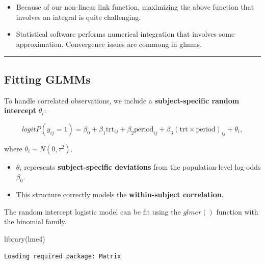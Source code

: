 \documentclass[
  letterpaper,
  DIV=11,
  numbers=noendperiod]{scrreprt}
\newenvironment{Shaded}{\begin{snugshade}}{\end{snugshade}}
\newcommand{\FunctionTok}[1]{\textcolor[rgb]{0.28,0.35,0.67}{#1}}
\newcommand{\NormalTok}[1]{\textcolor[rgb]{0.00,0.23,0.31}{#1}}
\providecommand{\tightlist}{%
  \setlength{\itemsep}{0pt}\setlength{\parskip}{0pt}}\usepackage{longtable,booktabs,array}
\begin{document}
\begin{itemize}
\item
  Because of our non-linear link function, maximizing the above function
  that involves an integral is quite challenging.
\item
  Statistical software performs numerical integration that involves some
  approximation. Convergence issues are commong in glmms.
\end{itemize}

\begin{center}\rule{0.5\linewidth}{0.5pt}\end{center}

\hypertarget{fitting-glmms}{%
\subsection*{Fitting GLMMs}\label{fitting-glmms}}

To handle correlated observations, we include a \textbf{subject-specific
random intercept} \(\theta_i\):

\[
logit P(y_{ij}=1) = \beta_0 + \beta_1 \text{trt}_{ij} + \beta_2 \text{period}_{ij} + \beta_3 (\text{trt} \times \text{period})_{ij} + \theta_i,
\]

where \(\theta_i \sim N(0, \tau^2)\).

\begin{itemize}
\tightlist
\item
  \(\theta_i\) represents \textbf{subject-specific deviations} from the
  population-level log-odds \(\beta_0\).
\item
  This structure correctly models the \textbf{within-subject
  correlation}.
\end{itemize}

The random intercept logistic model can be fit using the \(glmer()\)
function with the binomial family.

\begin{Shaded}
\begin{Highlighting}[]
\FunctionTok{library}\NormalTok{(lme4)}
\end{Highlighting}
\end{Shaded}

\begin{verbatim}
Loading required package: Matrix
\end{verbatim}
\end{document}
